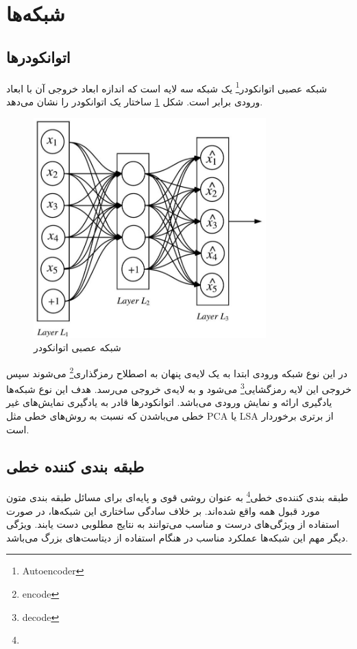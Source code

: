 \documentclass[12pt, a4paper, oneside]{report}
\begin{document}
\section{شبکه‌ها}

\subsection{اتوانکودرها}

شبکه عصبی
اتوانکودر\footnote{Autoencoder}
یک شبکه سه لایه است که اندازه ابعاد خروجی آن با ابعاد ورودی برابر است. شکل 
\ref{fig:autoencoder}
ساختار یک اتوانکودر را نشان می‌دهد.

\begin{figure}[!ht]
    \centering
    \includegraphics[width=0.80\textwidth]{autoencoder}
    \caption{شبکه عصبی اتوانکودر}
    \label{fig:autoencoder}
\end{figure}

در این نوع شبکه ورودی ابتدا به یک لایه‌ی پنهان به اصطلاح
رمزگذاری\footnote{encode}
می‌شوند سپس خروجی این لایه 
رمزگشایی\footnote{decode}
می‌شود و به لایه‌ی خروجی می‌رسد. هدف این نوع شبکه‌ها یادگیری ارائه‌ و نمایش ورودی می‌باشد. اتوانکودرها قادر به یادگیری
نمایش‌های غیر خطی می‌باشدن که نسبت به روش‌های خطی مثل
PCA
یا
LSA
از برتری برخوردار است.

\subsection{طبقه بندی کننده خطی}

طبقه بندی کننده‌ی خطی\footnote{}
به عنوان روشی قوی و پایه‌ای برای مسائل طبقه بندی متون مورد قبول همه واقع شده‌اند. بر خلاف
سادگی ساختاری این شبکه‌ها، در صورت استفاده از ویژگی‌های درست و مناسب می‌توانند به نتایج مطلوبی
دست‌ یابند. ویژگی دیگر مهم این شبکه‌ها عملکرد مناسب در هنگام استفاده از دیتاست‌های بزرگ می‌باشد\cite{joulin2016fasttext}.
\end{document}
